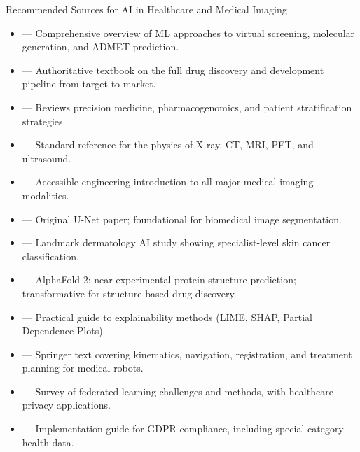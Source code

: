 \begin{v3topic}{Recommended Sources for AI in Healthcare and Medical Imaging}
    \begin{itemize}
        \item {} --- Comprehensive overview of ML approaches to virtual screening, molecular generation, and ADMET prediction.
        \item {} --- Authoritative textbook on the full drug discovery and development pipeline from target to market.
        \item {} --- Reviews precision medicine, pharmacogenomics, and patient stratification strategies.
        \item {} --- Standard reference for the physics of X-ray, CT, MRI, PET, and ultrasound.
        \item {} --- Accessible engineering introduction to all major medical imaging modalities.
        \item {} --- Original U-Net paper; foundational for biomedical image segmentation.
        \item {} --- Landmark dermatology AI study showing specialist-level skin cancer classification.
        \item {} --- AlphaFold 2: near-experimental protein structure prediction; transformative for structure-based drug discovery.
        \item {} --- Practical guide to explainability methods (LIME, SHAP, Partial Dependence Plots).
        \item {} --- Springer text covering kinematics, navigation, registration, and treatment planning for medical robots.
        \item {} --- Survey of federated learning challenges and methods, with healthcare privacy applications.
        \item {} --- Implementation guide for GDPR compliance, including special category health data.
    \end{itemize}
\end{v3topic}
